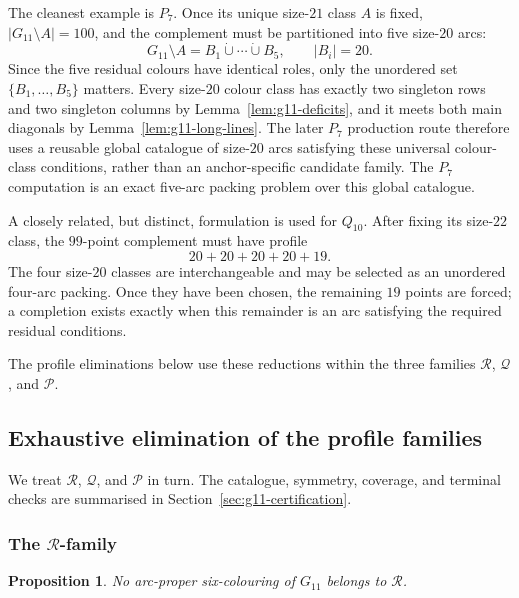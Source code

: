 \documentclass[11pt]{article}
\newtheorem{proposition}[theorem]{Proposition}
\theoremstyle{definition}
\theoremstyle{remark}
\begin{document}
The cleanest example is \(P_7\).  Once its unique size-\(21\) class \(A\) is
fixed, \(|G_{11}\setminus A|=100\), and the complement must be partitioned
into five size-\(20\) arcs:
\[
  G_{11}\setminus A
  =B_1\dot\cup\cdots\dot\cup B_5,
  \qquad |B_i|=20.
\]
Since the five residual colours have identical roles, only the unordered set
\(\{B_1,\ldots,B_5\}\) matters.  Every size-\(20\) colour class has exactly
two singleton rows and two singleton columns by
Lemma~\ref{lem:g11-deficits}, and it meets both main diagonals by
Lemma~\ref{lem:g11-long-lines}.  The later \(P_7\) production route therefore
uses a reusable global catalogue of size-\(20\) arcs satisfying these universal
colour-class conditions, rather than an anchor-specific candidate family.
The \(P_7\) computation is an exact five-arc packing problem over this global
catalogue.

A closely related, but distinct, formulation is used for \(Q_{10}\).  After
fixing its size-\(22\) class, the \(99\)-point complement must have profile
\[
  20+20+20+20+19.
\]
The four size-\(20\) classes are interchangeable and may be selected as an
unordered four-arc packing.  Once they have been chosen, the remaining
\(19\) points are forced; a completion exists exactly when this remainder is
an arc satisfying the required residual conditions.

The profile eliminations below use these reductions within the three
families \(\mathcal R\), \(\mathcal Q\), and \(\mathcal P\).

\subsection{Exhaustive elimination of the profile families}
\label{sec:g11-profile-elimination}

We treat \(\mathcal R\), \(\mathcal Q\), and \(\mathcal P\) in turn.  The
catalogue, symmetry, coverage, and terminal checks are summarised in
Section~\ref{sec:g11-certification}.

\subsubsection{The \texorpdfstring{\(\mathcal R\)}{R}-family}

\begin{proposition}\label{prop:g11-R}
No arc-proper six-colouring of \(G_{11}\) belongs to \(\mathcal R\).
\end{proposition}
\end{document}
